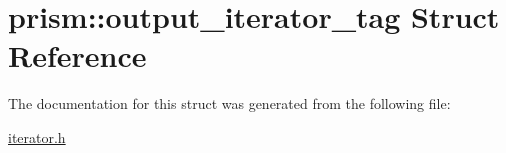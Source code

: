 \hypertarget{structprism_1_1output__iterator__tag}{}\section{prism\+:\+:output\+\_\+iterator\+\_\+tag Struct Reference}
\label{structprism_1_1output__iterator__tag}


The documentation for this struct was generated from the following file\+:\begin{DoxyCompactItemize}
\item 
\hyperlink{iterator_8h}{iterator.\+h}\end{DoxyCompactItemize}
